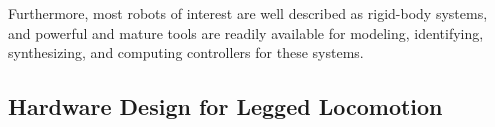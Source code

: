 Furthermore, most robots of interest are well described as rigid-body systems, and powerful and mature tools are readily available for modeling, identifying, synthesizing, and computing controllers for these systems.


\subsection{Hardware Design for Legged Locomotion}

